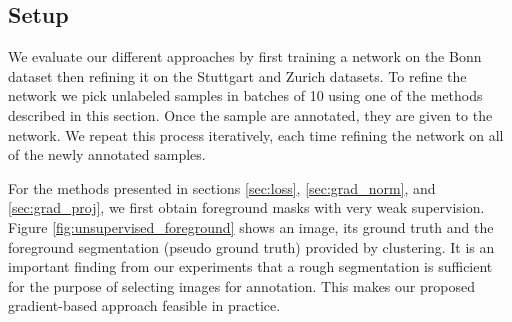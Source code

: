\documentclass[letterpaper, 10 pt, conference]{ieeeconf}  %
\begin{document}
%
%
%
%
%


\subsection{Setup}

We evaluate our different approaches by first training a network on the Bonn dataset then refining it on the Stuttgart and Zurich datasets. To refine the network we pick unlabeled samples in batches of 10 using one of the methods described in this section. Once the sample are annotated, they are given to the network. We repeat this process iteratively, each time refining the network on all of the newly annotated samples. 

For the methods presented in sections \ref{sec:loss}, \ref{sec:grad_norm}, and \ref{sec:grad_proj}, we first obtain foreground masks with very weak supervision. Figure  \ref{fig:unsupervised_foreground} shows an image, its ground truth and the foreground segmentation (pseudo ground truth) provided by clustering. It is an important finding from our experiments that a rough segmentation is sufficient for the purpose of selecting images for annotation. This makes our proposed gradient-based approach feasible in practice.
\end{document}
